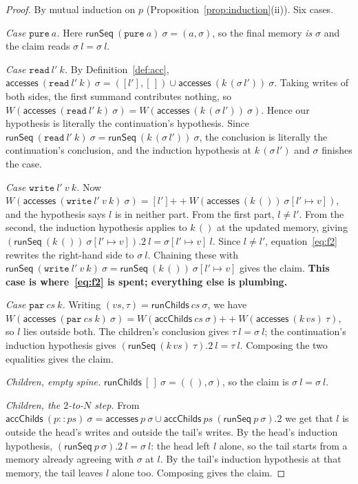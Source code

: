 \documentclass[11pt,a4paper]{article}
\theoremstyle{definition}
\theoremstyle{plain}
\theoremstyle{remark}
\newcommand{\st}{\sigma}
\newcommand{\writes}[1]{W(#1)}
\newcommand{\acc}{\mathsf{accesses}}
\newcommand{\runSeq}{\mathsf{runSeq}}
\newcommand{\upd}[3]{#1[#2 \mapsto #3]}
\begin{document}
\begin{proof}
By mutual induction on $p$ (Proposition~\ref{prop:induction}(ii)). Six cases.

\emph{Case $\texttt{pure}\ a$.} Here $\runSeq\ (\texttt{pure}\ a)\ \st = (a,\st)$, so the
final memory \emph{is} $\st$ and the claim reads $\st\ l = \st\ l$.

\emph{Case $\texttt{read}\ l'\ k$.} By Definition~\ref{def:acc},
$\acc\ (\texttt{read}\ l'\ k)\ \st = ([l'],[\,]) \cup \acc\ (k\,(\st\,l'))\ \st$. Taking
writes of both sides, the first summand contributes nothing, so
$\writes{\acc\ (\texttt{read}\ l'\ k)\ \st} = \writes{\acc\ (k\,(\st\,l'))\ \st}$. Hence our
hypothesis is literally the continuation's hypothesis. Since
$\runSeq\ (\texttt{read}\ l'\ k)\ \st = \runSeq\ (k\,(\st\,l'))\ \st$, the conclusion is
literally the continuation's conclusion, and the induction hypothesis at $k\,(\st\,l')$ and
$\st$ finishes the case.

\emph{Case $\texttt{write}\ l'\ v\ k$.} Now
$\writes{\acc\ (\texttt{write}\ l'\ v\ k)\ \st} = [l'] \mathbin{+\!\!+} \writes{\acc\ (k\,())\ \upd{\st}{l'}{v}}$,
and the hypothesis says $l$ is in neither part. From the first part, $l \neq l'$. From the
second, the induction hypothesis applies to $k\,()$ at the updated memory, giving
$(\runSeq\ (k\,())\ \upd{\st}{l'}{v}).2\ l = \upd{\st}{l'}{v}\ l$. Since $l \neq l'$,
equation~\eqref{eq:f2} rewrites the right-hand side to $\st\ l$. Chaining these with
$\runSeq\ (\texttt{write}\ l'\ v\ k)\ \st = \runSeq\ (k\,())\ \upd{\st}{l'}{v}$ gives the
claim. \textbf{This case is where~\eqref{eq:f2} is spent; everything else is plumbing.}

\emph{Case $\texttt{par}\ cs\ k$.} Writing $(vs,\tau) = \mathsf{runChilds}\ cs\ \st$, we have
$\writes{\acc\ (\texttt{par}\ cs\ k)\ \st} = \writes{\mathsf{accChilds}\ cs\ \st} \mathbin{+\!\!+} \writes{\acc\ (k\,vs)\ \tau}$,
so $l$ lies outside both. The children's conclusion gives $\tau\ l = \st\ l$; the
continuation's induction hypothesis gives
$(\runSeq\ (k\,vs)\ \tau).2\ l = \tau\ l$. Composing the two equalities gives the claim.

\emph{Children, empty spine.} $\mathsf{runChilds}\ [\,]\ \st = ((),\st)$, so the claim is
$\st\ l = \st\ l$.

\emph{Children, the $2$-to-$N$ step.} From
$\mathsf{accChilds}\ (p :: ps)\ \st = \acc\ p\ \st \cup \mathsf{accChilds}\ ps\ (\runSeq\ p\ \st).2$
we get that $l$ is outside the head's writes and outside the tail's writes. By the head's
induction hypothesis, $(\runSeq\ p\ \st).2\ l = \st\ l$: the head left $l$ alone, so the
tail starts from a memory already agreeing with $\st$ at $l$. By the tail's induction
hypothesis at that memory, the tail leaves $l$ alone too. Composing gives the claim.
\end{proof}
\end{document}
